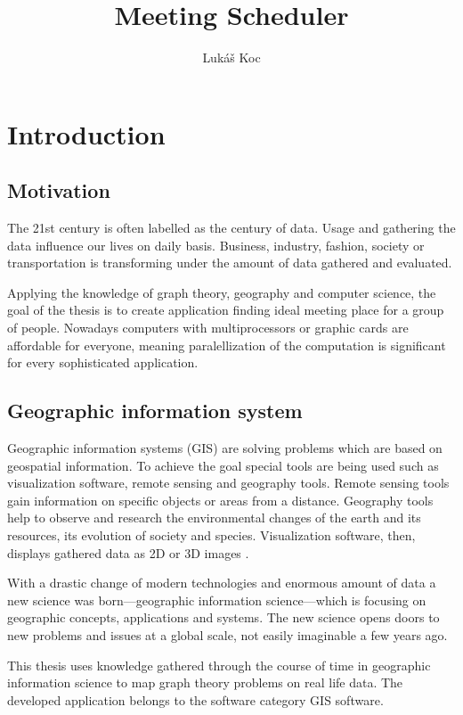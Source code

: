 \documentclass[thesis=M,english]{FITthesis}[2012/10/20]
\title{Meeting Scheduler}
\author{Luk{\' a}{\v s} Koc} %
\begin{document}

\chapter{Introduction}

\section{Motivation}
The 21st century is often labelled as the century of data. Usage and gathering the data influence our lives on daily basis. Business, industry, fashion, society or transportation is transforming under the amount of data gathered and evaluated. 



Applying the knowledge of graph theory, geography and computer science, the goal of the thesis is to create application finding ideal meeting place for a group of people. 
Nowadays computers with multiprocessors or graphic cards are affordable for everyone, meaning paralellization of the computation is significant for every sophisticated application.

\section{Geographic information system}
Geographic information systems (GIS) are solving problems which are based on geospatial information. To achieve the goal special tools are being used such as visualization software, remote sensing and geography tools. Remote sensing tools gain information on specific objects or areas from a distance. Geography tools help to observe and research the environmental changes of the earth and its resources, its evolution of society and species. Visualization software, then, displays gathered data as 2D or 3D images \cite{Chen10}.

With a drastic change of modern technologies and enormous amount of data a new science was born---geographic information science---which is focusing on geographic concepts, applications and systems. The new science opens doors to new problems and issues at a global scale, not easily imaginable a few years ago. 

This thesis uses knowledge gathered through the course of time in geographic information science to map graph theory problems on real life data. The developed application belongs to the software category GIS software. 
\end{document}
